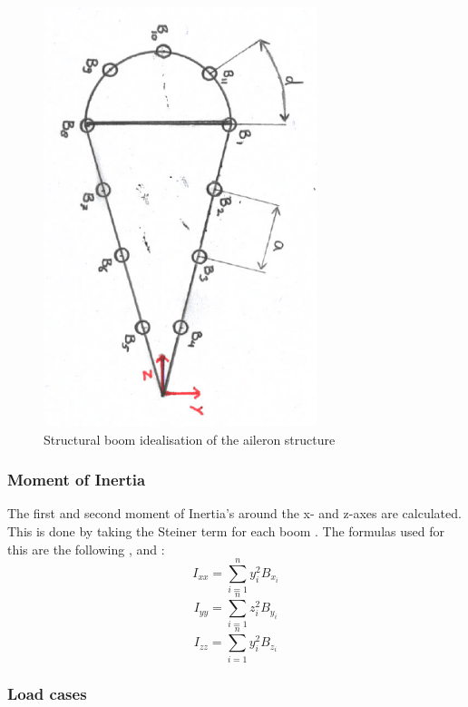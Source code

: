 \begin{figure}[H]
    \centering
    \includegraphics[width=8cm,angle=90]{Images/boom.pdf}
    \caption{Structural boom idealisation of the aileron structure}
    \label{fig:boom}
\end{figure}

\subsubsection{Moment of Inertia}
\label{subsubsec:MoI}
The first and second moment of Inertia's around the x- and z-axes are calculated. This is done by taking the Steiner term for each boom \cite{the_book}. The formulas used for this are the following ,  and :
\begin{equation}
\label{MoI_xx}
    I_{x x}=\sum_{i=1}^{n} y_{i}^{2} B_{x_{i}}
\end{equation}
\begin{equation}
\label{MoI_yy}
    I_{y y}=\sum_{i=1}^{n} z_{i}^{2} B_{y_{i}}
\end{equation}
\begin{equation}
\label{MoI_zz}
    I_{z z}=\sum_{i=1}^{n} y_{i}^{2} B_{z_{i}}
\end{equation}

\subsubsection{Load cases}

